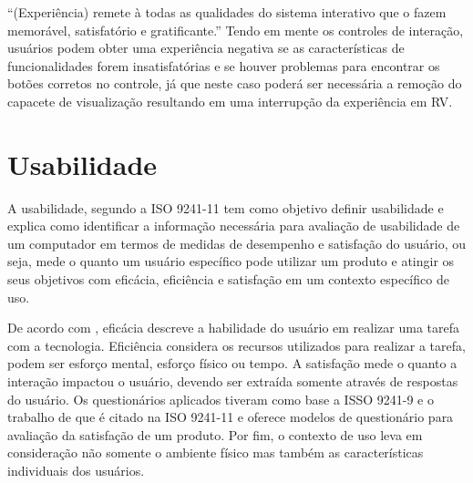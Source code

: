 “(Experiência) remete à todas as qualidades do sistema interativo que o fazem memorável, satisfatório e gratificante.” \cite[tradução nossa]{benyon} Tendo em mente os controles de interação, usuários podem obter uma experiência negativa se as características de funcionalidades forem insatisfatórias e se houver problemas para encontrar os botões corretos no controle, já que neste caso poderá ser necessária a remoção do capacete de visualização resultando em uma interrupção da experiência em RV. 

\section{Usabilidade}

A usabilidade, segundo a ISO 9241-11 \cite{iso9241} tem como objetivo definir usabilidade e explica como identificar a informação necessária para avaliação de usabilidade de um computador em termos de medidas de desempenho e satisfação do usuário, ou seja, mede o quanto um usuário específico pode utilizar um produto e atingir os seus objetivos com eficácia, eficiência e satisfação em um contexto específico de uso.

De acordo com , eficácia descreve a habilidade do usuário em realizar uma tarefa com a tecnologia. Eficiência considera os recursos utilizados para realizar a tarefa, podem ser esforço mental, esforço físico ou tempo. A satisfação mede o quanto a interação impactou o usuário, devendo ser extraída somente através de respostas do usuário. Os questionários aplicados tiveram como base a ISSO 9241-9 e o trabalho de \cite{lewis} que é citado na ISO 9241-11 e oferece modelos de questionário para avaliação da satisfação de um produto. Por fim, o contexto de uso leva em consideração não somente o ambiente físico mas também as características individuais dos usuários. 




